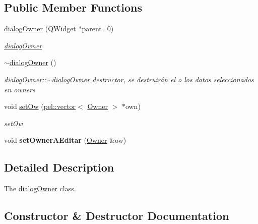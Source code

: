 \subsection*{Public Member Functions}
\begin{DoxyCompactItemize}
\item 
\hyperlink{classdialogOwner_a6d4b17329380be5d0a7aa71452e4e0a0}{dialog\+Owner} (Q\+Widget $\ast$parent=0)
\begin{DoxyCompactList}\small\item\em \hyperlink{classdialogOwner}{dialog\+Owner} \end{DoxyCompactList}\item 
\hypertarget{classdialogOwner_adba2ef2a476b1eae66587322fcfac107}{}\hyperlink{classdialogOwner_adba2ef2a476b1eae66587322fcfac107}{$\sim$dialog\+Owner} ()\label{classdialogOwner_adba2ef2a476b1eae66587322fcfac107}

\begin{DoxyCompactList}\small\item\em \hyperlink{classdialogOwner_adba2ef2a476b1eae66587322fcfac107}{dialog\+Owner\+::$\sim$dialog\+Owner} destructor, se destruirán el o los datos seleccionados en owners \end{DoxyCompactList}\item 
void \hyperlink{classdialogOwner_add1764a10a2e39ff76e16cbd19bc1def}{set\+Ow} (\hyperlink{classpel_1_1vector}{pel\+::vector}$<$ \hyperlink{classOwner}{Owner} $>$ $\ast$own)
\begin{DoxyCompactList}\small\item\em set\+Ow \end{DoxyCompactList}\item 
\hypertarget{classdialogOwner_aa91556917f50ed58875fb96b668f6191}{}void {\bfseries set\+Owner\+A\+Editar} (\hyperlink{classOwner}{Owner} \&ow)\label{classdialogOwner_aa91556917f50ed58875fb96b668f6191}

\end{DoxyCompactItemize}


\subsection{Detailed Description}
The \hyperlink{classdialogOwner}{dialog\+Owner} class. 

\subsection{Constructor \& Destructor Documentation}
\hypertarget{classdialogOwner_a6d4b17329380be5d0a7aa71452e4e0a0}{}
